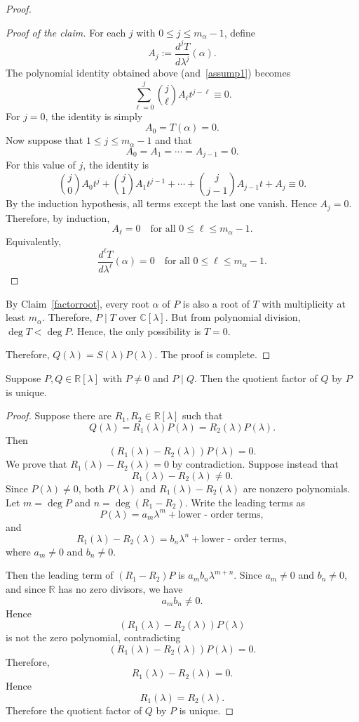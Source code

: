 ﻿\documentclass[12pt]{article}
\begin{document}
\begin{proof}
\begin{proof}[Proof of the claim]
For each $j$ with $0\le j\le m_\alpha - 1$, define
\[
 A_j:=
 \frac{d^jT}{d\lambda^j}(\alpha).
\]
The polynomial identity obtained above (and~\eqref{assump1}) becomes
\[
 \sum_{\ell = 0}^{j}\binom{j}{\ell}A_\ell t^{j - \ell}\equiv0.
\]
For $j = 0$, the identity is simply
\[
 A_0 = T(\alpha) = 0.
\]
Now suppose that $1\le j\le m_\alpha - 1$ and that
\[
 A_0 = A_1 = \cdots = A_{j - 1} = 0.
\]
For this value of $j$, the identity is
\[
 \binom{j}{0}A_0t^j
 +
 \binom{j}{1}A_1t^{j - 1}
 + \cdots
 +
 \binom{j}{j - 1}A_{j - 1}t
 +
 A_j
 \equiv0.
\]
By the induction hypothesis, all terms except the last one vanish. Hence
$A_j = 0$.
Therefore, by induction,
\[
 A_\ell = 0
 \quad
 \text{for all }0\le \ell\le m_\alpha - 1.
\]
Equivalently,
\[
 \frac{d^\ell T}{d\lambda^\ell}(\alpha) = 0
 \quad
 \text{for all }0\le \ell\le m_\alpha - 1.
\]
\end{proof}
By Claim~\eqref{factorroot}, every root $\alpha$ of $P$ is also a root of $T$ with multiplicity at least $m_\alpha$. Therefore,
$
 P \mid T
$ over $\mathbb C[\lambda]$. But from polynomial division,
$
 \deg T < \deg P
$. Hence, the only possibility is $T = 0$.

Therefore, $Q(\lambda) = S(\lambda)P(\lambda)$. The proof is complete.
\end{proof}
\begin{lemma}\label{lem:operator-quotient-unique}
    Suppose $P, Q \in \mathbb R[\lambda]$ with $P \neq 0$ and $P \mid Q$. Then the quotient factor of $Q$ by $P$ is unique.
\end{lemma}

\begin{proof}
    Suppose there are $R_1, R_2 \in \mathbb R[\lambda]$ such that
    \[
 Q(\lambda) = R_1(\lambda)P(\lambda) = R_2(\lambda)P(\lambda).
 \]
    Then
    \[
 (R_1(\lambda) - R_2(\lambda))P(\lambda) = 0.
 \]
    We prove that $R_1(\lambda) - R_2(\lambda) = 0$ by contradiction. Suppose instead that
    \[
 R_1(\lambda) - R_2(\lambda) \neq 0.
 \]
    Since $P(\lambda) \neq 0$, both $P(\lambda)$ and $R_1(\lambda) - R_2(\lambda)$ are nonzero polynomials.
    Let $m = \deg P$ and  $n = \deg(R_1 - R_2)$. Write the leading terms as
    \[
 P(\lambda) = a_m\lambda^m + \text{lower - order terms},
 \]
    and
    \[
 R_1(\lambda) - R_2(\lambda) = b_n\lambda^n + \text{lower - order terms},
 \]
    where $a_m \neq 0$ and $b_n \neq 0$.

    Then the leading term of $(R_1 - R_2)P$ is $a_mb_n\lambda^{m + n}$.
    Since $a_m \neq 0$ and $b_n \neq 0$, and since $\mathbb R$ has no zero divisors, we have
    \[
 a_mb_n \neq 0.
 \]
    Hence
    \[
 (R_1(\lambda) - R_2(\lambda))P(\lambda)
 \]
    is not the zero polynomial, contradicting
    \[
 (R_1(\lambda) - R_2(\lambda))P(\lambda) = 0.
 \]
    Therefore,
    \[
 R_1(\lambda) - R_2(\lambda) = 0.
 \]
    Hence
    \[
 R_1(\lambda) = R_2(\lambda).
 \]
    Therefore the quotient factor of $Q$ by $P$ is unique.
\end{proof}
\end{document}
